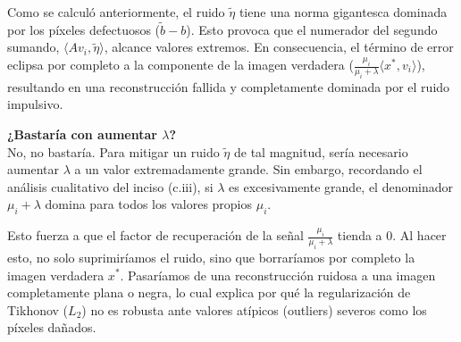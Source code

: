 \documentclass{article}
\begin{document}
\begin{enumerate}[label=\roman*., widest=iii]
  Como se calculó anteriormente, el ruido $\tilde{\eta}$ tiene una norma gigantesca dominada por los píxeles defectuosos ($\tilde{b} - b$). Esto provoca que el numerador del segundo sumando, $\langle A v_i, \tilde{\eta} \rangle$, alcance valores extremos. En consecuencia, el término de error eclipsa por completo a la componente de la imagen verdadera ($\frac{\mu_i}{\mu_i + \lambda} \langle x^*, v_i \rangle$), resultando en una reconstrucción fallida y completamente dominada por el ruido impulsivo.

\textbf{¿Bastaría con aumentar $\lambda$?} \\

  No, no bastaría. Para mitigar un ruido $\tilde{\eta}$ de tal magnitud, sería necesario aumentar $\lambda$ a un valor extremadamente grande. Sin embargo, recordando el análisis cualitativo del inciso (c.iii), si $\lambda$ es excesivamente grande, el denominador $\mu_i + \lambda$ domina para todos los valores propios $\mu_i$. 

  Esto fuerza a que el factor de recuperación de la señal $\frac{\mu_i}{\mu_i + \lambda}$ tienda a $0$. Al hacer esto, no solo suprimiríamos el ruido, sino que borraríamos por completo la imagen verdadera $x^*$. Pasaríamos de una reconstrucción ruidosa a una imagen completamente plana o negra, lo cual explica por qué la regularización de Tikhonov ($L_2$) no es robusta ante valores atípicos (outliers) severos como los píxeles dañados.

\end{enumerate}
\despueslista

\end{document}
